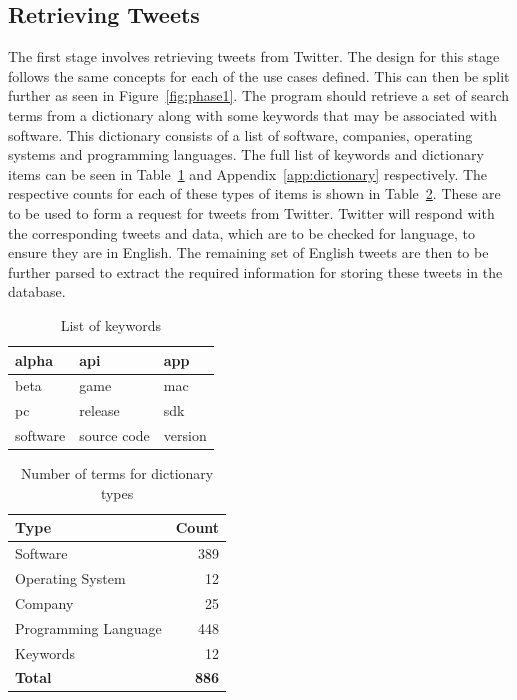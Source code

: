 \subsection{Retrieving Tweets}
\label{sec:arc1}
The first stage involves retrieving tweets from Twitter. The design for this stage follows the same concepts for each of the use cases defined. This can then be split further as seen in Figure~\ref{fig:phase1}. The program should retrieve a set of search terms from a dictionary along with some keywords that may be associated with software. This dictionary consists of a list of software, companies, operating systems and programming languages. The full list of keywords and dictionary items can be seen in Table~\ref{tbl:keywords} and Appendix~\ref{app:dictionary} respectively. The respective counts for each of these types of items is shown in Table~\ref{tbl:dict_types}.
These are to be used to form a request for tweets from Twitter. Twitter will respond with the corresponding tweets and data, which are to be checked for language, to ensure they are in English. The remaining set of English tweets are then to be further parsed to extract the required information for storing these tweets in the database.

\begin{table}[h]
\begin{center}
\begin{tabular}{|l|l|l|}\hline
alpha&api&app\\\hline
beta&game&mac\\\hline
pc&release&sdk\\\hline
software&source code&version\\\hline
\end{tabular}
\end{center}
\caption{List of keywords}
\label{tbl:keywords}
\end{table}

\begin{table}[h]
\begin{center}
\begin{tabular}{|l|r|}\hline\hline
\textbf{Type}&\textbf{Count}\\\hline
Software&389\\
Operating System&12\\
Company&25\\
Programming Language&448\\
Keywords&12\\\hline
\textbf{Total}&\textbf{886}\\\hline\hline
\end{tabular}
\end{center}
\caption{Number of terms for dictionary types}
\label{tbl:dict_types}
\end{table}

